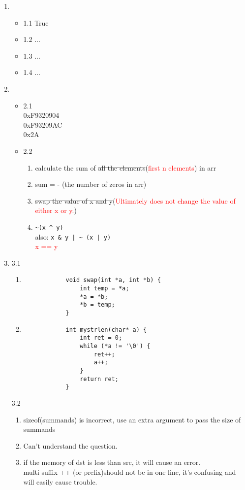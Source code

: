 \documentclass[12pt,a4paper]{article}
\begin{document}
\begin{enumerate}
	\item \begin{itemize}
		\item 1.1 True
		\item 1.2 ...
		\item 1.3 ...
		\item 1.4 ...
	\end{itemize}
	\item \begin{itemize}
		\item 2.1\\0xF9320904\\0xF93209AC\\0x2A
		\item 2.2\begin{enumerate}
			\item calculate the sum of \sout{all the elements}(\textcolor{red}{first n elements}) in arr
			\item sum = - (the number of zeros in arr)
			\item \sout{swap the value of x and y}(\textcolor{red}{Ultimately does not change the value of either x or y.})
			\item \verb|~(x ^ y)|\\also: \verb"x & y | ~ (x | y)"
			\\\textcolor{red}{x == y}
		\end{enumerate}
	\end{itemize}
	\item 3.1\begin{enumerate}
		\item \begin{verbatim}
			void swap(int *a, int *b) {
				int temp = *a;
				*a = *b;
				*b = temp;
			}
		\end{verbatim}
		\item \begin{verbatim}
			int mystrlen(char* a) {
				int ret = 0;
				while (*a != '\0') {
					ret++;
					a++;
				}
				return ret;
			}
		\end{verbatim}
	\end{enumerate}
	3.2\begin{enumerate}
		\item sizeof(summands) is incorrect, use an extra argument to pass the size of summands
		\item Can't understand the question.
		\item if the memory of dst is less than src, it will cause an error.\\multi suffix ++ (or prefix)should not be in one line, it's confusing and will easily cause trouble.

\end{enumerate}
\end{enumerate}
\end{document}
